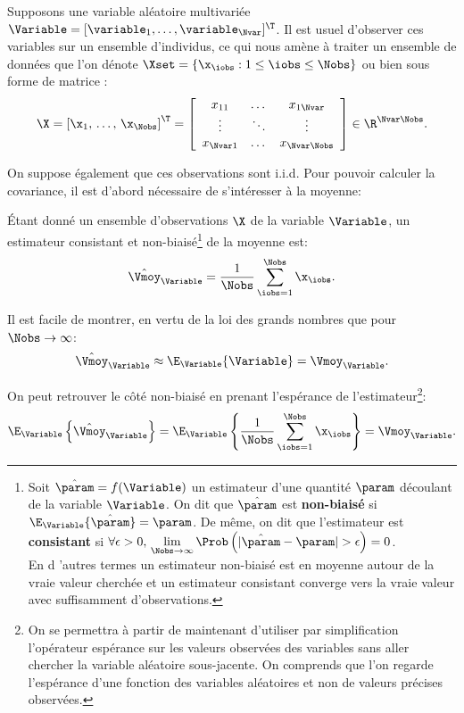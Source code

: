 Supposons une variable aléatoire multivariée $\Variable=[\variable_1,\dots,\variable_\Nvar]^\T$. Il est usuel d'observer ces variables sur un ensemble d'individus, ce qui nous amène à traiter un ensemble de données que l'on dénote $\Xset = \{\x_\iobs:1\leq\iobs\leq\Nobs\}$ ou bien sous forme de matrice :
\begin{equation}
  \X = \left[\x_1,\, \dots,\, \x_\Nobs \right]^\T = \left[ \begin{array}{ccc} x_{11} & \dots & x_{1\Nvar} \\ \vdots & \ddots & \vdots \\ x_{\Nvar 1} & \dots & x_{\Nvar \Nobs}   \end{array}  \right]\in\R^{\Nvar\Nobs}.
  \label{eq:context-definition-observed_data}
\end{equation}

On suppose également que ces observations sont i.i.d. Pour pouvoir calculer la covariance, il est d'abord nécessaire de s'intéresser à la moyenne:
\begin{proposition}
  \'Etant donné un ensemble d'observations $\X$ de la variable $\Variable$, un estimateur consistant et non-biaisé\footnote{Soit $\hat{\param}=f(\Variable)$ un estimateur d'une quantité $\param$ découlant de la variable $\Variable$. On dit que $\hat{\param}$ est \textbf{non-biaisé} si $\E_\Variable\{\hat{\param}\} = \param$. De même, on dit que l'estimateur est \textbf{consistant} si $\forall \epsilon>0,\, \displaystyle\lim_{\Nobs\to\infty} \Prob\left(|\hat{\param}-\param|>\epsilon\right)=0$.\\En d 'autres termes un estimateur non-biaisé est en moyenne autour de la vraie valeur cherchée et un estimateur consistant converge vers la vraie valeur avec suffisamment d'observations.} de la moyenne est:
  \begin{equation}
    \hat{\Vmoy}_\Variable = \frac{1}{\Nobs}\sum_{\iobs=1}^{\Nobs} \x_\iobs.
    \label{eq:context-estimation-moyenne}
  \end{equation}
\end{proposition}

\begin{remark}
  Il est facile de montrer, en vertu de la loi des grands nombres que pour $\Nobs\to\infty$:
  $$
  \hat{\Vmoy}_\Variable \approx \E_\Variable\{\Variable\}=\Vmoy_\Variable.
  $$
\end{remark}


\begin{remark}
  On peut retrouver le côté non-biaisé en prenant l'espérance de l'estimateur\footnote{On se permettra à partir de maintenant d'utiliser par simplification l'opérateur espérance sur les valeurs observées des variables sans aller chercher la variable aléatoire sous-jacente. On comprends que l'on regarde l'espérance d'une fonction des variables aléatoires et non de valeurs précises observées.}:
  $$
  \E_\Variable\left\{\hat{\Vmoy}_\Variable\right\} = \E_\Variable\left\{\frac{1}{\Nobs}\sum_{\iobs=1}^{\Nobs}\x_\iobs\right\} = \Vmoy_\Variable.
  $$
\end{remark}


